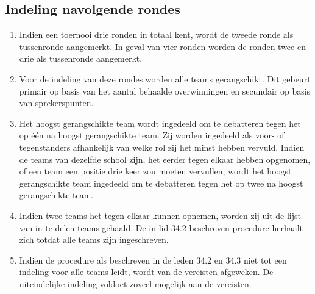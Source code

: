 \subsection{Indeling navolgende rondes}

\begin{enumerate}
\item Indien een toernooi drie ronden in totaal kent, wordt de tweede ronde als tussenronde aangemerkt. In geval van vier ronden worden de ronden twee en drie als tussenronde aangemerkt.
\item Voor de indeling van deze rondes worden alle teams gerangschikt. Dit gebeurt primair op basis van het aantal behaalde overwinningen en secundair op basis van sprekerspunten.
\item Het hoogst gerangschikte team wordt ingedeeld om te debatteren tegen het op één na hoogst gerangschikte team. Zij worden ingedeeld als voor- of tegenstanders afhankelijk van welke rol zij het minst hebben vervuld. Indien de teams van dezelfde school zijn, het eerder tegen elkaar hebben opgenomen, of een team een positie drie keer zou moeten vervullen, wordt het hoogst gerangschikte team ingedeeld om te debatteren tegen het op twee na hoogst gerangschikte team. 
\item Indien twee teams het tegen elkaar kunnen opnemen, worden zij uit de lijst van in te delen teams gehaald. De in lid 34.2 beschreven procedure herhaalt zich totdat alle teams zijn ingeschreven.
\item Indien de procedure als beschreven in de leden 34.2 en 34.3 niet tot een indeling voor alle teams leidt, wordt van de vereisten afgeweken. De uiteindelijke indeling voldoet zoveel mogelijk aan de vereisten.
\end{enumerate}
